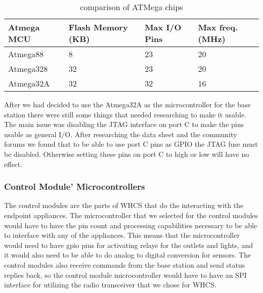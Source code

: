 \begin{table}[H]
\centering
\begin{tabular}{|l|l|l|l|}
\hline
{\color{black} Atmega MCU} &
{\color{black} Flash Memory (KB)} &
{\color{black} Max I/O Pins} &
{\color{black} Max freq. (MHz)}\\\hline
{\color{black} Atmega88} &
{\color{black} 8} &
{\color{black} 23} &
{\color{black} 20}\\\hline
{\color{black} Atmega328} &
{\color{black} 32} &
{\color{black} 23} &
{\color{black} 20}\\\hline
{\color{black} Atmega32A} &
{\color{black} 32} &
{\color{black} 32} &
{\color{black} 16}\\\hline
\end{tabular}
\caption{comparison of ATMega chips}
\label{tab:atmega-chips}
\end{table}

After we had decided to use the Atmega32A as the microcontroller for the base
station there were still some things that needed researching to make it usable.
The main issue was disabling the JTAG interface on port C to make the pins
usable as general I/O. After researching the data sheet and the community
forums we found that to be able to use port C pins as GPIO the JTAG fuse must
be disabled. Otherwise setting these pins on port C to high or low will have no
effect.

\subsubsection{Control Module' Microcontrollers}
The control modules are the parts of WHCS that do the interacting with the
endpoint appliances. The microcontroller that we selected for the control
modules would have to have the pin count and processing capabilities necessary
to be able to interface with any of the appliances. This means that the
microcontroller would need to have gpio pins for activating relays for the
outlets and lights, and it would also need to be able to do analog to digital
conversion for sensors. The control modules also receive commands from the base
station and send status replies back, so the control module microcontroller
would have to have an SPI interface for utilizing the radio transceiver that we
chose for WHCS.

